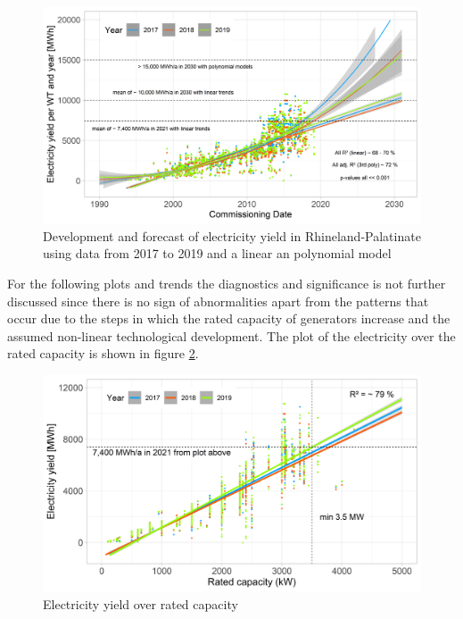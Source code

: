 \documentclass[a4paper,11pt]{article}
\begin{document}
\begin{figure}

{\centering \includegraphics[width=1\linewidth]{data/Amprion/results_of_analysis/electricity_yield_2017-2019_rlp_over_comissioning_date2} 

}

\caption{Development and forecast of electricity yield in Rhineland-Palatinate using data from 2017 to 2019 and a linear an polynomial model}\label{fig:electricityyield}
\end{figure}
For the following plots and trends the diagnostics and significance is not further discussed since there is no sign of abnormalities apart from the patterns that occur due to the steps in which the rated capacity of generators increase and the assumed non-linear technological development. The plot of the electricity over the rated capacity is shown in figure \ref{fig:eratedcapacity}.
\begin{figure}[H]

{\centering \includegraphics[width=1\linewidth]{data/Amprion/results_of_analysis/electricity_rated_capacity} 

}

\caption{Electricity yield over rated capacity}\label{fig:eratedcapacity}
\end{figure}
\end{document}
